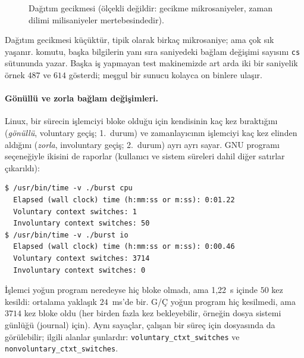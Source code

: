 \begin{figure}[H]
\centering
{}
\caption{Dağıtım gecikmesi (ölçekli değildir: gecikme mikrosaniyeler, zaman dilimi milisaniyeler mertebesindedir).}
\end{figure}

Dağıtım gecikmesi küçüktür, tipik olarak birkaç mikrosaniye; ama çok sık yaşanır.  komutu, başka bilgilerin yanı sıra saniyedeki bağlam değişimi sayısını \texttt{cs} sütununda yazar. Başka iş yapmayan test makinemizde art arda iki bir saniyelik örnek $487$ ve $614$ gösterdi; meşgul bir sunucu kolayca on binlere ulaşır.

\paragraph{Gönüllü ve zorla bağlam değişimleri.} Linux, bir sürecin işlemciyi bloke olduğu için kendisinin kaç kez bıraktığını (\emph{gönüllü}, voluntary geçiş; 1.~durum) ve zamanlayıcının işlemciyi kaç kez elinden aldığını (\emph{zorla}, involuntary geçiş; 2.~durum) ayrı ayrı sayar. GNU  programı  seçeneğiyle ikisini de raporlar (kullanıcı ve sistem süreleri dahil diğer satırlar çıkarıldı):

\begin{lstlisting}[style=term]
$ /usr/bin/time -v ./burst cpu
  Elapsed (wall clock) time (h:mm:ss or m:ss): 0:01.22
  Voluntary context switches: 1
  Involuntary context switches: 50
$ /usr/bin/time -v ./burst io
  Elapsed (wall clock) time (h:mm:ss or m:ss): 0:00.46
  Voluntary context switches: 3714
  Involuntary context switches: 0
\end{lstlisting}

{\sloppy İşlemci yoğun program neredeyse hiç bloke olmadı, ama 1,22~s içinde $50$ kez kesildi: ortalama yaklaşık $24$~ms'de bir. G/Ç yoğun program hiç kesilmedi, ama $3714$ kez bloke oldu (her  birden fazla kez bekleyebilir, örneğin dosya sistemi günlüğü (journal) için). Aynı sayaçlar, çalışan bir süreç için  dosyasında da görülebilir; ilgili alanlar şunlardır:
\texttt{voluntary\_ctxt\_switches} ve \texttt{nonvoluntary\_ctxt\_switches}.\par}

